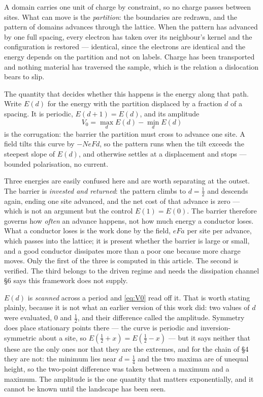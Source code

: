 \documentclass[11pt]{article}
\newcommand{\half}{\tfrac12}
\begin{document}
A domain carries one unit of charge by constraint, so no charge passes between sites. What can move
is the \emph{partition}: the boundaries are redrawn, and the pattern of domains advances through the
lattice. When the pattern has advanced by one full spacing, every electron has taken over its
neighbour's kernel and the configuration is restored --- identical, since the electrons are identical
and the energy depends on the partition and not on labels. Charge has been transported and nothing
material has traversed the sample, which is the relation a dislocation bears to slip.

The quantity that decides whether this happens is the energy along that path. Write $E(d)$ for the
energy with the partition displaced by a fraction $d$ of a spacing. It is periodic, $E(d+1)=E(d)$,
and its amplitude
\begin{equation}\label{eq:V0}
V_0 = \max_d E(d) - \min_d E(d)
\end{equation}
is the corrugation: the barrier the partition must cross to advance one site. A field tilts this
curve by $-NeFd$, so the pattern runs when the tilt exceeds the steepest slope of $E(d)$, and
otherwise settles at a displacement and stops --- bounded polarisation, no current.

Three energies are easily confused here and are worth separating at the outset. The barrier is
\emph{invested and returned}: the pattern climbs to $d=\half$ and descends again, ending one site
advanced, and the net cost of that advance is zero --- which is not an argument but the control
$E(1)=E(0)$. The barrier therefore governs how \emph{often} an advance happens, not how much energy
a conductor loses. What a conductor loses is the work done by the field, $eFa$ per site per advance,
which passes into the lattice; it is present whether the barrier is large or small, and a good
conductor dissipates more than a poor one because more charge moves. Only the first of the three is
computed in this article. The second is verified. The third belongs to the driven regime and needs
the dissipation channel \S6 says this framework does not supply.

$E(d)$ is \emph{scanned} across a period and \eqref{eq:V0} read off it. That is worth stating
plainly, because it is not what an earlier version of this work did: two values of $d$ were
evaluated, $0$ and $\half$, and their difference called the amplitude. Symmetry does place
stationary points there --- the curve is periodic and inversion-symmetric about a site, so
$E(\half+x)=E(\half-x)$ --- but it says neither that these are the only ones nor that they are the
extremes, and for the chain of \S4 they are not: the minimum lies near $d=\tfrac14$ and the two
maxima are of unequal height, so the two-point difference was taken between a maximum and a
maximum. The amplitude is the one quantity that matters exponentially, and it cannot be known until
the landscape has been seen.
\end{document}
